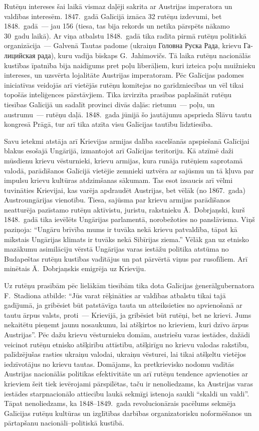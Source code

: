 \documentclass[twoside,a5paper,12pt,fleqn,openany]{extbook}
\newcommand{\rutxti}[1]{\textrussian{#1}}
\newcommand{\uktxti}[1]{\textukrainian{#1}}
\begin{document}
Rutēņu intereses šai laikā vismaz daļēji sakrita ar Austrijas imperatora un valdības interesēm. 1847.~gadā Galīcijā iznāca 32 rutēņu izdevumi, bet 1848.~gadā~--- jau 156 (tiesa, tas bija rekords un netika pārspēts nākamo 30~gadu laikā). Ar viņa atbalstu 1848.~gadā tika radīta pirmā rutēņu politiskā organizācija~--- Galvenā Tautas padome (ukraiņu \uktxti{Головна Руска Рада}, krievu \rutxti{Галицийская рада}), kuru vadīja bīskaps G.~Jahimovičs. Tā laika rutēņu nacionālās kustības īpatnība bija naidīgums pret poļu liberāļiem, kuri izteica poļu muižnieku intereses, un uzsvērta lojalitāte Austrijas imperatoram. Pēc Galīcijas padomes iniciatīvas veidojās arī vietējās rutēņu komitejas no garīdzniecības un vēl tikai topošās inteliģences pārstāvjiem. Tika izvirzīta prasības paplašināt rutēņu tiesības Galīcijā un sadalīt provinci divās daļās: rietumu~--- poļu, un austrumu~--- rutēņu daļā. 1848.~gada jūnijā šo jautājumu apsprieda Slāvu tautu kongresā Prāgā, tur arī tika atzīta visu Galīcijas tautību līdztiesība.

Savu ietekmi atstāja arī Krievijas armijas dalība sacelšanās apspiešanā Galīcijai blakus esošajā Ungārijā, izmantojot arī Galīcijas teritoriju. Kā atzīmē daži mūsdienu krievu vēsturnieki, krievu armijas, kura runāja rutēņiem saprotamā valodā, parādīšanos Galīcijā vietējie zemnieki uztvēra ar sajūsmu un tā kļuva par impulsu krievu kultūras atdzimšanas sākumam. Tas esot izsaucis arī vēlmi tuvināties Krievijai, kas varēja apdraudēt Austrijas, bet vēlāk (no 1867.~gada) Austroungārijas vienotību. Tiesa, sajūsma par krievu armijas parādīšanos neatturēja pazīstamo rutēņu aktīvistu, juristu, rakstnieku Ā.~Dobrjaņski, kurš 1848.~gadā tika ievēlēts Ungārijas parlamentā, norobežoties no panslāvisma. Viņš paziņoja: ``Ungāru brīvība mums ir tuvāka nekā krievu patvaldība, tāpat kā mīkstais Ungārijas klimats ir tuvāks nekā Sibīrijas ziema.'' Vēlāk gan uz etnisko mazākumu asimilāciju vērstā Ungārijas varas iestāžu politika atstūma no Budapeštas rutēņu kustības vadītājus un pat pārvērtā viņus par rusofīliem. Arī minētais Ā.~Dobrjaņskis emigrēja uz Krieviju.

Uz rutēņu prasībām pēc lielākām tiesībām tika dota Galīcijas ģenerālgubernatora F.~Stadiona atbilde: ``Jūs varat rēķināties ar valdības atbalstu tikai tajā gadījumā, ja gribēsiet būt patstāvīga tauta un atteiksieties no apvienošanā ar tautu ārpus valsts, proti~--- Krievijā, ja gribēsiet būt rutēņi, bet ne krievi. Jums nekaitētu pieņemt jaunu nosaukumu, lai atšķirtos no krieviem, kuri dzīvo ārpus Austrijas''. Pēc dažu krievu vēsturnieku domām, austriešu varas iestādes, dažādi veicinot rutēņu etnisko atšķirību attīstību, atšķirīgu no krievu valodas rakstību, palīdzējušas rasties ukraiņu valodai, ukraiņu vēsturei, lai tikai atšķeltu vietējos iedzīvotājus no krievu tautas. Domājams, ka pretkrievisko nodomu vadītās Austrijas nacionālās politikas efektivitāte un arī rutēņu tendence apvienoties ar krieviem šeit tiek ievērojami pārspīlētas, taču ir nenoliedzams, ka Austrijas varas iestādes starpnacionālo attiecību laukā sekmīgi īstenoja saukli ``skaldi un valdi''. Tāpat nenoliedzams, ka 1848--1849.~gada revolucionārais pacēlums sekmēja Galīcijas rutēņu kultūras un izglītības darbības organizatorisku noformēšanos un pārtapšanu nacionāli--politiskā kustībā.
\end{document}
